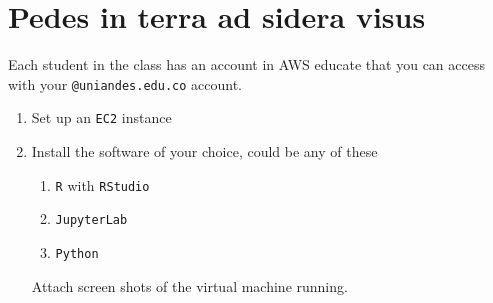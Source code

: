 \documentclass[12pt,onecolumn]{article}
\begin{document}
\section{Pedes in terra ad sidera visus}

Each student in the class has an account in AWS educate that you can access with your \texttt{@uniandes.edu.co} account.

\begin{enumerate}
  \item Set up an \texttt{EC2} instance
  \item Install the software of your choice, could be any of these
  \begin{enumerate}
    \item \texttt{R} with \texttt{RStudio}
    \item \texttt{JupyterLab}
    \item \texttt{Python}
  \end{enumerate}

Attach screen shots of the virtual machine running.   
\end{enumerate}
\end{document}
